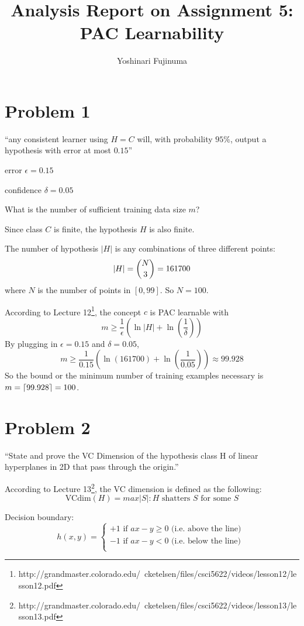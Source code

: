 \documentclass[11pt]{article}
\DeclarePairedDelimiter\ceil{\lceil}{\rceil}
\begin{document}
\title{Analysis Report on Assignment 5: PAC Learnability}
\author{Yoshinari Fujinuma}
\date{}
\maketitle

\section{Problem 1}
``any consistent learner using $H=C$ will, with probability $95\%$, output a hypothesis with error at most $0.15$''

error $\epsilon = 0.15$

confidence $\delta = 0.05$

What is the number of sufficient training data size $m$?

Since class $C$ is finite, the hypothesis $H$ is also finite.

The number of hypothesis $|H|$ is any combinations of three different points:
$$
|H| = \dbinom{N}{3} = 161700
$$
where $N$ is the number of points in $[0, 99]$. So $N = 100$.

According to Lecture 12\footnote{http://grandmaster.colorado.edu/~cketelsen/files/csci5622/videos/lesson12/lesson12.pdf}, the concept $c$ is PAC learnable with 
$$
m \geq \frac{1}{\epsilon}(\ln |H| + \ln(\frac{1}{\delta}))
$$
By plugging in $\epsilon = 0.15$ and $\delta = 0.05$, 
$$
m \geq \frac{1}{0.15}(\ln(161700) + \ln(\frac{1}{0.05})) \approx 99.928
$$
So the bound or the minimum number of training examples necessary is $m = \ceil{99.928} = 100$.


\section{Problem 2}
``State and prove the VC Dimension of the hypothesis class H of linear hyperplanes in 2D that pass through the origin.''

According to Lecture 13\footnote{http://grandmaster.colorado.edu/~cketelsen/files/csci5622/videos/lesson13/lesson13.pdf}, the VC dimension is defined as the following:
$$
\mbox{VCdim}(H) = max{|S|: H \mbox{ shatters } S \mbox{ for some } S}
$$

Decision boundary: 
$$ 
h(x, y) = \begin{cases} 
          +1 \mbox{ if } ax - y \geq 0 \mbox{ (i.e. above the line) }\\
          -1 \mbox{ if } ax - y < 0 \mbox{ (i.e. below the line) }\\
\end{cases}
$$
\end{document}
